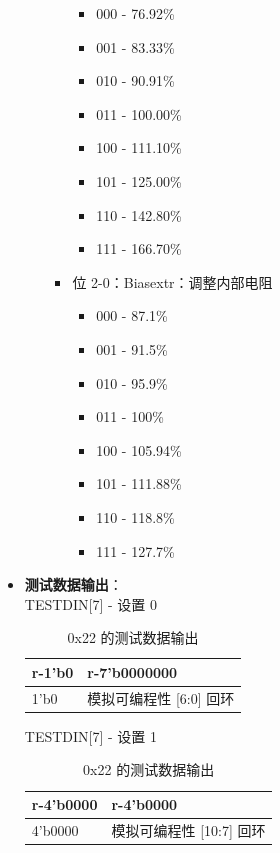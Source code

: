 \documentclass[main\_\_CN.tex]{subfiles}
\begin{document}
\begin{itemize}
\begin{itemize}
\begin{itemize}
                        \begin{itemize}
                            \item 000 - 76.92\%
                            \item 001 - 83.33\%
                            \item 010 - 90.91\%
                            \item 011 - 100.00\%
                            \item 100 - 111.10\%
                            \item 101 - 125.00\%
                            \item 110 - 142.80\%
                            \item 111 - 166.70\%
                        \end{itemize}
                    \item 位 2-0：Biasextr：调整内部电阻
                        \begin{itemize}
                            \item 000 - 87.1\%
                            \item 001 - 91.5\%
                            \item 010 - 95.9\%
                            \item 011 - 100\%
                            \item 100 - 105.94\%
                            \item 101 - 111.88\%
                            \item 110 - 118.8\%
                            \item 111 - 127.7\%
                        \end{itemize}
                \end{itemize}
        \end{itemize}
    \item \textbf{测试数据输出}：\\
        TESTDIN[7] - 设置 0
        \begin{longtable}{ |p{3cm}|p{9cm}|}
            \caption{0x22 的测试数据输出}
            \label{tab:test-dout-0x22-set0} \\
            \hline
            \rowcolor{lightgray}
            \textbf{r-1'b0} & \textbf{r-7'b0000000} \\ \hline
            1'b0 & 模拟可编程性 [6:0] 回环 \\ \hline
        \end{longtable}
        TESTDIN[7] - 设置 1
        \begin{longtable}{ |p{3cm}|p{9cm}|}
            \caption{0x22 的测试数据输出}
            \label{tab:test-dout-0x22-set1} \\
            \hline
            \rowcolor{lightgray}
            \textbf{r-4'b0000} & \textbf{r-4'b0000} \\ \hline
            4'b0000 & 模拟可编程性 [10:7] 回环 \\ \hline
        \end{longtable}
\end{itemize}
\end{document}
